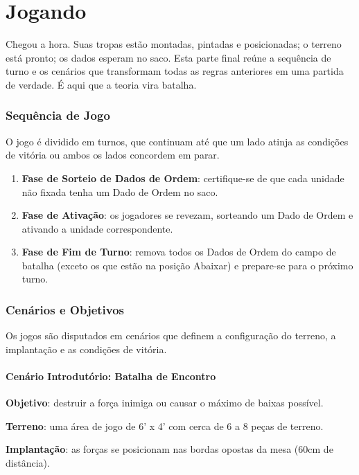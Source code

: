 \part{Jogando}

Chegou a hora. Suas tropas estão montadas, pintadas e posicionadas; o terreno está pronto; os dados esperam no saco. Esta parte final reúne a sequência de turno e os cenários que transformam todas as regras anteriores em uma partida de verdade. É aqui que a teoria vira batalha.

\section{Sequência de Jogo}

O jogo é dividido em turnos, que continuam até que um lado atinja as condições de vitória ou ambos os lados concordem em parar.

\begin{enumerate}[leftmargin=1.2cm]
  \item \textbf{Fase de Sorteio de Dados de Ordem}: certifique-se de que cada unidade não fixada tenha um Dado de Ordem no saco.
  \item \textbf{Fase de Ativação}: os jogadores se revezam, sorteando um Dado de Ordem e ativando a unidade correspondente.
  \item \textbf{Fase de Fim de Turno}: remova todos os Dados de Ordem do campo de batalha (exceto os que estão na posição Abaixar) e prepare-se para o próximo turno.
\end{enumerate}

\section{Cenários e Objetivos}

Os jogos são disputados em cenários que definem a configuração do terreno, a implantação e as condições de vitória.

\subsection{Cenário Introdutório: Batalha de Encontro}

\textbf{Objetivo}: destruir a força inimiga ou causar o máximo de baixas possível.

\textbf{Terreno}: uma área de jogo de 6' x 4' com cerca de 6 a 8 peças de terreno.

\textbf{Implantação}: as forças se posicionam nas bordas opostas da mesa (60cm de distância).

